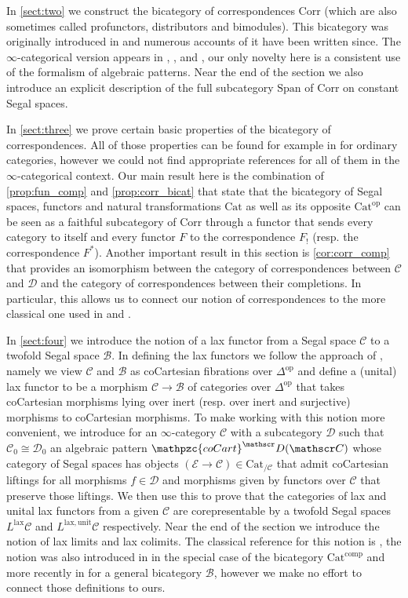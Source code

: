 \documentclass[a4paper, reqno]{amsart}
\theoremstyle{definition}
\newcommand\cB{\mathscr B}
\newcommand\cC{\mathscr C}
\newcommand\cD{\mathscr D}
\newcommand\cE{\mathscr E}
\newcommand\op{\mathrm{op}}
\newcommand\cat{\mathrm{Cat}}
\newcommand\comp{\mathrm{comp}}
\newcommand\spanc{\mathrm{Span}}
\newcommand\corr{\mathrm{Corr}}
\newcommand\ccart{\mathpzc{coCart}}
\newcommand\lax{\mathrm{lax}}
\newcommand\un{\mathrm{unit}}
\begin{document}
In \cref{sect:two} we construct the bicategory of correspondences $\corr$ (which are also sometimes called profunctors, distributors and bimodules). This bicategory was originally introduced in \cite{benabou1973distributeurs} and numerous accounts of it have been written since. The $\infty$-categorical version appears in \cite[Section 2.3.1.]{lurie2009higher}, \cite{ayala2017fibrations}, \cite{haugseng2019segal} and \cite{haugseng2015bimodules}, our only novelty here is a consistent use of the formalism of algebraic patterns. Near the end of the section we also introduce an explicit description of the full subcategory $\spanc$ of $\corr$ on constant Segal spaces.\par
In \cref{sect:three} we prove certain basic properties of the bicategory of correspondences. All of those properties can be found for example in \cite{street1980fibrations} for ordinary categories, however we could not find appropriate references for all of them in the $\infty$-categorical context. Our main result here is the combination of \cref{prop:fun_comp} and \cref{prop:corr_bicat} that state that the bicategory of Segal spaces, functors and natural transformations $\cat$ as well as its opposite $\cat^\op$ can be seen as a faithful subcategory of $\corr$ through a functor that sends every category to itself and every functor $F$ to the correspondence $F_!$ (resp. the correspondence $F^*$). Another important result in this section is \cref{cor:corr_comp} that provides an isomorphism between the category of correspondences between $\cC$ and $\cD$ and the category of correspondences between their completions. In particular, this allows us to connect our notion of correspondences to the more classical one used in \cite{lurie2009higher} and \cite{ayala2017fibrations}.\par
In \cref{sect:four} we introduce the notion of a lax functor from a Segal space $\cC$ to a twofold Segal space $\cB$. In defining the lax functors we follow the approach of \cite{gaitsgory2017study}, namely we view $\cC$ and $\cB$ as coCartesian fibrations over $\Delta^\op$ and define a (unital) lax functor to be a morphism $\cC\rightarrow\cB$ of categories over $\Delta^\op$ that takes coCartesian morphisms lying over inert (resp. over inert and surjective) morphisms to coCartesian morphisms. To make working with this notion more convenient, we introduce for an $\infty$-category $\cC$ with a subcategory $\cD$ such that $\cC_0\cong\cD_0$ an algebraic pattern $\ccart^\cD(\cC)$ whose category of Segal spaces has objects $(\cE\rightarrow\cC)\in\cat_{/\cC}$ that admit coCartesian liftings for all morphisms $f\in\cD$ and morphisms given by functors over $\cC$ that preserve those liftings. We then use this to prove that the categories of lax and unital lax functors from a given $\cC$ are corepresentable by a twofold Segal spaces $L^\lax\cC$ and $L^{\lax,\un}\cC$ respectively. Near the end of the section we introduce the notion of lax limits and lax colimits. The classical reference for this notion is \cite{street1976limits}, the notion was also introduced in \cite{gepner2015lax} in the special case of the bicategory $\cat^\comp$ and more recently in \cite{gagna2020fibrations} for a general bicategory $\cB$, however we make no effort to connect those definitions to ours. \par
\end{document}
